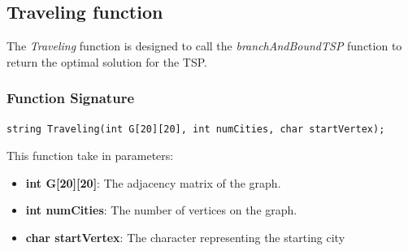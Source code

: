 \documentclass[a4paper]{article}
\begin{document}
\subsection{Traveling function}
The \textit{Traveling} function is designed to call the \textit{branchAndBoundTSP} function to return the optimal solution for the TSP. 
\subsubsection{Function Signature}
\begin{verbatim}
string Traveling(int G[20][20], int numCities, char startVertex);
\end{verbatim}
This function take in parameters:
\begin{itemize}
    \item \textbf{int G[20][20]}: The adjacency matrix of the graph.
    \item \textbf{int numCities}: The number of vertices on the graph.
    \item \textbf{char startVertex}: The character representing the starting city
\end{itemize}
\end{document}
